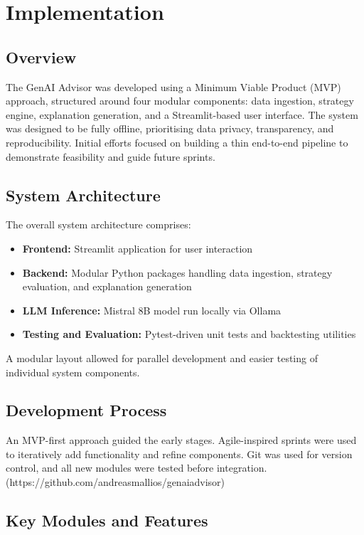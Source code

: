 \section{Implementation}

\subsection{Overview}

The GenAI Advisor was developed using a Minimum Viable Product (MVP) approach, structured around four modular components: data ingestion, strategy engine, explanation generation, and a Streamlit-based user interface. The system was designed to be fully offline, prioritising data privacy, transparency, and reproducibility. Initial efforts focused on building a thin end-to-end pipeline to demonstrate feasibility and guide future sprints.

\subsection{System Architecture}

The overall system architecture comprises:
\begin{itemize}
    \item \textbf{Frontend:} Streamlit application for user interaction
    \item \textbf{Backend:} Modular Python packages handling data ingestion, strategy evaluation, and explanation generation
    \item \textbf{LLM Inference:} Mistral 8B model run locally via Ollama
    \item \textbf{Testing and Evaluation:} Pytest-driven unit tests and backtesting utilities
\end{itemize}

A modular layout allowed for parallel development and easier testing of individual system components.

\subsection{Development Process}

An MVP-first approach guided the early stages. Agile-inspired sprints were used to iteratively add functionality and refine components. Git was used for version control, and all new modules were tested before integration. (https://github.com/andreasmallios/genaiadvisor)

\subsection{Key Modules and Features}

